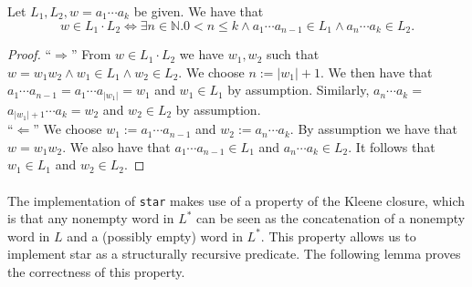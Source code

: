     \begin{lemma}
        \label{concP}
        Let $L_1, L_2, w = a_1 \cdots a_k$ be given. We have that
        \begin{equation*}
            w \in L_1 \cdot L_2  
            \iff
            \exists n \in \mathbb{N}. 0 < n \le k \wedge a_1 \cdots a_{n-1} \in L_1 \wedge a_n \cdots a_k \in L_2.
        \end{equation*}
    \end{lemma}
    \begin{proof}
        ``$\Rightarrow$'' 
        From $w \in L_1 \cdot L_2$ we have $w_1, w_2$ such that $w = w_1 w_2 \wedge w_1 \in L_1 \wedge w_2 \in L_2$.
        We choose $n := |w_1|+1$. We then have that $a_1 \cdots a_{n-1} = a_1 \cdots a_{|w_1|} = w_1$ and $w_1 \in L_1$ by assumption.
        Similarly, $a_{n} \cdots a_k = $$ a_{|w_1| + 1} \cdots a_k = w_2$ and $w_2 \in L_2$ by assumption.
        \\
        ``$\Leftarrow$'' 
        We choose $w_1 := a_1 \cdots a_{n-1}$ and $w_2 := a_n \cdots a_k$. By assumption we have that $w = w_1 w_2$.
        We also have that $a_1 \cdots a_{n-1} \in L_1$ and $a_{n} \cdots a_k \in L_2$. 
        It follows that $w_1 \in L_1$ and $w_2 \in L_2$.
    \end{proof}
    

    \paragraph{}
    The implementation of \lstinline{star} makes use of a property of the Kleene closure, 
    which is that any nonempty word in $L^*$ can be seen as the concatenation of a nonempty word in $L$ and a (possibly empty) word in $L^*$.
    This property allows us to implement star as a structurally recursive predicate.
    The following lemma proves the correctness of this property.

